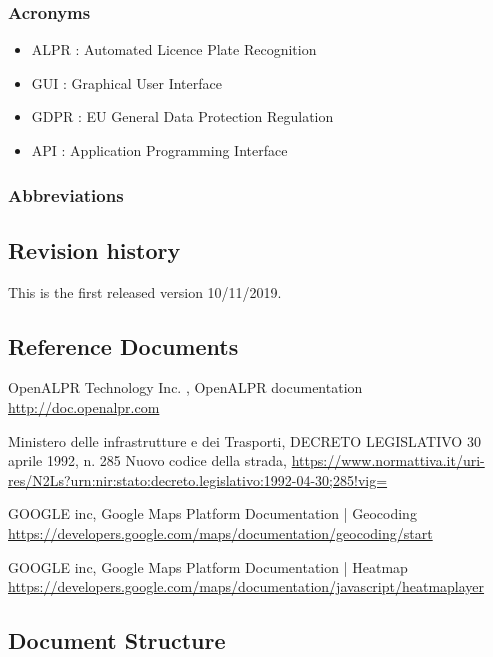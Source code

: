 \subsubsection{Acronyms}
\begin{itemize}
  \item ALPR : Automated Licence Plate Recognition
  \item GUI : Graphical User Interface
  \item GDPR : EU General Data Protection Regulation
  \item API : Application Programming Interface
\end{itemize}

\subsubsection{Abbreviations}


\subsection{Revision history}
This is the first released version 10/11/2019.

\subsection{Reference Documents}
\begin{thebibliography}{00}
OpenALPR Technology Inc. ,
OpenALPR documentation \url{http://doc.openalpr.com}

 Ministero delle infrastrutture e dei Trasporti,
DECRETO LEGISLATIVO 30 aprile 1992, n. 285 Nuovo codice della strada,
 \url{https://www.normattiva.it/uri-res/N2Ls?urn:nir:stato:decreto.legislativo:1992-04-30;285!vig=}

 GOOGLE inc,
 Google Maps Platform Documentation | Geocoding
 \url{https://developers.google.com/maps/documentation/geocoding/start}

 GOOGLE inc,
 Google Maps Platform Documentation | Heatmap
 \url{https://developers.google.com/maps/documentation/javascript/heatmaplayer}

\end{thebibliography}

\subsection{Document Structure}
